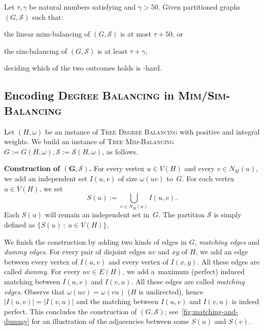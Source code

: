 \documentclass[a4paper,UKenglish,cleveref,hyperref,autoref]{lipics-v2021}
\newcommand{\weight}{\omega}
\newcommand{\tdb}{\textsc{Tree Degree Balancing}\xspace}
\newcommand{\tmb}{\textsc{Tree Mim-Balancing}\xspace}
\begin{document}
\begin{theorem}
  Let $\tau, \gamma$ be natural numbers satisfying  and $\gamma > 50$.
  Given partitioned graphs $(G,\mathcal S)$ such that:
  \begin{compactitem}
  \item the linear mim-balancing of $(G, \mathcal{S})$ is at most $\tau + 50$, or
  \item the sim-balancing of $(G, \mathcal{S})$ is at least $\tau + \gamma$,
  \end{compactitem}
  deciding which of the two outcomes holds is \NP-hard.
\end{theorem}

\subsection{Encoding \textsc{Degree Balancing} in \textsc{Mim/Sim-Balancing}}

Let $(H, \weight)$ be an instance of \tdb with positive and integral weights.
We build an instance of \tmb $G := G(H, \weight), \mathcal S := \mathcal{S}(H, \weight)$, as follows.

\medskip

\textbf{Construction of $\bm{(G,\mathcal S)}$.}
For every vertex $u \in V(H)$ and every $v \in N_H(u)$, we add an independent set $I(u, v)$ of size $\weight(uv)$ to~$G$.
For each vertex $u \in V(H)$, we set~$$S(u) := \bigcup_{v \in N_H(u)} I(u, v).$$
Each $S(u)$ will remain an independent set in~$G$.
The partition $\mathcal S$ is simply defined as $\{S(u)~:~u \in V(H)\}$.

We finish the construction by adding two kinds of edges in $G$, \emph{matching edges} and \emph{dummy edges}. 
For every pair of disjoint edges $uv$ and $xy$ of $H$, we add an edge between every vertex of $I(u, v)$ and every vertex of $I(x, y)$.
All these edges are called \emph{dummy}.
For every $uv \in E(H)$, we add a~maximum (perfect) induced matching between $I(u,v)$ and $I(v,u)$.
All these edges are called \emph{matching edges}.
Observe that $\weight(uv)=\weight(vu)$ ($H$ is undirected), hence $|I(u,v)|=|I(v,u)|$ and the matching between $I(u,v)$ and $I(v,u)$ is indeed perfect.  
This concludes the construction of $(G, \mathcal S)$; see~\cref{fig:matching-and-dummy} for an illustration of the adjacencies between some $S(u)$ and $S(v)$.
\end{document}
